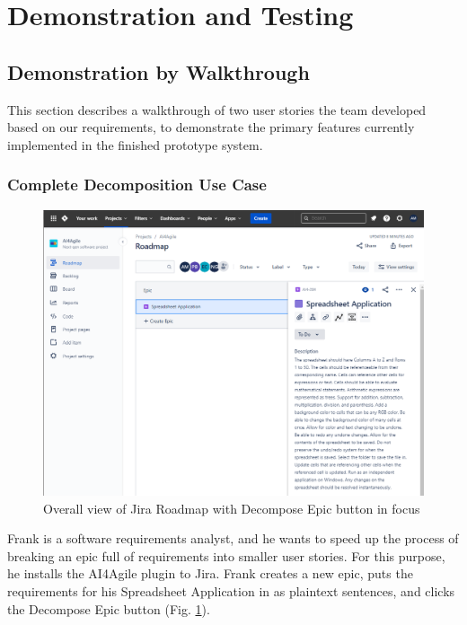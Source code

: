 \section{Demonstration and Testing}
\label{demo}

\subsection{Demonstration by Walkthrough}

This section describes a walkthrough of two user stories the team developed based on our requirements, to demonstrate the primary features currently implemented in the finished prototype system. 

\subsubsection{Complete Decomposition Use Case}
\label{Scenario1}

\begin{figure}
\centering
\includegraphics[width=\textwidth,keepaspectratio]{./figure/Scenario1Figure1.png}
\caption{Overall view of Jira Roadmap with Decompose Epic button in focus}
\label{fig:Scenario1Figure1}
\end{figure}

Frank is a software requirements analyst, and he wants to speed up the process of breaking an epic full of requirements into smaller user stories. For this purpose, he installs the AI4Agile plugin to Jira. Frank creates a new epic, puts the requirements for his Spreadsheet Application in as plaintext sentences, and clicks the Decompose Epic button (Fig. \ref{fig:Scenario1Figure1}).

